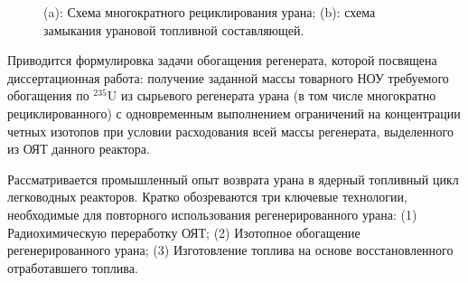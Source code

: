\begin{figure}[ht]
  \caption{(a): Схема многократного рециклирования урана; (b): схема замыкания урановой топливной составляющей.}\label{fig_autoref1}
\end{figure}
%     
%     

Приводится формулировка задачи обогащения регенерата, которой посвящена диссертационная работа: получение заданной массы товарного НОУ требуемого обогащения по $^{235}$U из сырьевого регенерата урана (в том числе многократно рециклированного) с одновременным выполнением ограничений на концентрации четных изотопов при условии расходования всей массы реге­нерата, выделенного из ОЯТ данного реактора.

Рассматривается промышленный опыт возврата урана в ядерный топливный цикл легководных реакторов. Кратко обозреваются три ключевые технологии, необходимые для повторного использования регенерированного урана:
(1) Радиохимическую переработку ОЯТ; (2) Изотопное обогащение регенерированного урана; (3) Изготовление топлива на основе восстановленного отработавшего топлива.


